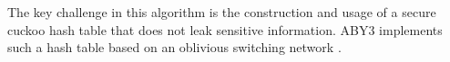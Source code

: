 The key challenge in this algorithm is the construction and usage of a secure cuckoo hash table that does not leak sensitive information. ABY3 implements such a hash table based on an oblivious switching network \cite{mohassel2020fast}. 










\




